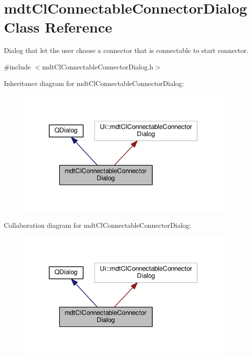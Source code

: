 \hypertarget{classmdt_cl_connectable_connector_dialog}{\section{mdt\-Cl\-Connectable\-Connector\-Dialog Class Reference}
\label{classmdt_cl_connectable_connector_dialog}
}


Dialog that let the user choose a connector that is connectable to start connector.  




{\ttfamily \#include $<$mdt\-Cl\-Connectable\-Connector\-Dialog.\-h$>$}



Inheritance diagram for mdt\-Cl\-Connectable\-Connector\-Dialog\-:\nopagebreak
\begin{figure}[H]
\begin{center}
\leavevmode
\includegraphics[width=308pt]{classmdt_cl_connectable_connector_dialog__inherit__graph}
\end{center}
\end{figure}


Collaboration diagram for mdt\-Cl\-Connectable\-Connector\-Dialog\-:\nopagebreak
\begin{figure}[H]
\begin{center}
\leavevmode
\includegraphics[width=308pt]{classmdt_cl_connectable_connector_dialog__coll__graph}
\end{center}
\end{figure}
